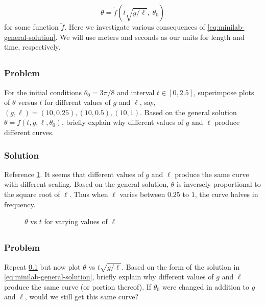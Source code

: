 \documentclass[12pt]{article}
\begin{document}
\begin{equation}
  \label{eq:minilab-general-solution}
  \theta = \tilde{f}(t\sqrt{g/\ell}, \;\theta_0)
\end{equation}
for some function $\tilde{f}$. Here we investigate various consequences of
\cref{eq:minilab-general-solution}. We will use meters and seconds as our units
for length and time, respectively.

\subsection{}
  \label{sec:minilab-part-1}
  \subsubsection*{Problem}
  For the initial conditions $\theta_0=3\pi/8$ and interval $t\in[0,2.5]$,
  superimpose plots of $\theta$ versus $t$ for different values of $g$ and $\ell$,
  say, $(g,\ell)=(10, 0.25), (10, 0.5), (10, 1)$. Based on the general solution
  $\theta = f(t,g,\ell,\theta_0)$, briefly explain why different values of $g$ and
  $\ell$ produce different curves.

  \subsubsection*{Solution}
  Reference \cref{fig:2-1-solution}. It seems that different values of $g$ and
  $\ell$ produce the same curve with different scaling. Based on the general
  solution, $\theta$ is inversely proportional to the square root of $\ell$.
  Thus when $\ell$ varies between $0.25$ to $1$, the curve halves in frequency.

  \begin{figure}
    \centering
    \scalebox{0.8}{\huge}
    \caption{$\theta$ vs $t$ for varying values of $\ell$}
    \label{fig:2-1-solution}
  \end{figure}

\subsection{}
  \label{sec:minilab-part-2}
  \subsubsection*{Problem}
  Repeat \cref{sec:minilab-part-1} but now plot $\theta$ vs $t\sqrt{g/\ell}$.
  Based on the form of the solution in \cref{eq:minilab-general-solution},
  briefly explain why different values of $g$ and $\ell$ produce the same curve
  (or portion thereof). If $\theta_0$ were changed in addition to $g$ and
  $\ell$, would we still get this same curve?
\end{document}
